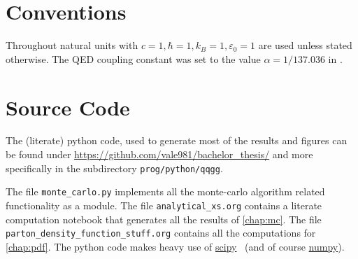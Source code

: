 \section{Conventions}%
\label{sec:convent}

Throughout natural units with \(c=1, \hbar = 1, k_B=1, \varepsilon_0
= 1\) are used unless stated otherwise. The QED coupling constant was
set to the value \(\alpha = 1/137.036\) in \sherpa.

\section{Source Code}%
\label{sec:source}

The (literate) python code, used to generate most of the results and
figures can be found under
\url{https://github.com/vale981/bachelor_thesis/} and more
specifically in the subdirectory \texttt{prog/python/qqgg}.

The file \texttt{monte\_carlo.py} implements all the monte-carlo
algorithm related functionality as a module. The file
\texttt{analytical\_xs.org} contains a literate computation notebook
that generates all the results of \cref{chap:mc}. The file
\texttt{parton\_density\_function\_stuff.org} contains all the
computations for \cref{chap:pdf}. The python code makes heavy use of
\href{https://www.scipy.org/}{scipy}~\cite{2020Virtanen:Sc} (and of
course \href{https://numpy.org/}{numpy}).


